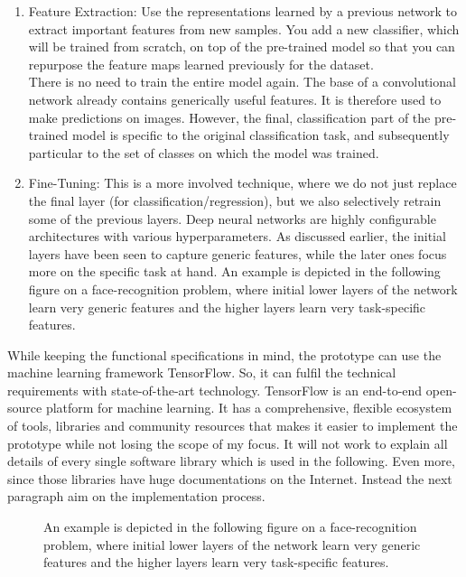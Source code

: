 \begin{enumerate}
	\item Feature Extraction: Use the representations learned by a previous network to extract important features from new samples. You add a new classifier, which will be trained from scratch, on top of the pre-trained model so that you can repurpose the feature maps learned previously for the dataset.\\
	
	There is no need to train the entire model again. The base of a convolutional network already contains generically useful features.  It is therefore used to make predictions on images. However, the final, classification part of the pre-trained model is specific to the original classification task, and subsequently particular to the set of classes on which the model was trained.
	
	\item 
	Fine-Tuning: This is a more involved technique, where we do not just replace the final layer (for classification/regression), but we also selectively retrain some of the previous layers. Deep neural networks are highly configurable architectures with various hyperparameters. As discussed earlier, the initial layers have been seen to capture generic features, while the later ones focus more on the specific task at hand. An example is depicted in the following figure on a face-recognition problem, where initial lower layers of the network learn very generic features and the higher layers learn very task-specific features.
\end{enumerate}

While keeping the functional specifications in mind, the prototype can use the machine learning framework TensorFlow. So, it can fulfil the technical requirements with state-of-the-art technology. TensorFlow is an end-to-end open-source platform for machine learning. It has a comprehensive, flexible ecosystem of tools, libraries and community resources that makes it easier to implement the prototype while not losing the scope of my focus. It will not work to explain all details of every single software library which is used in the following. Even more, since those libraries have huge documentations on the Internet. Instead the next paragraph aim on the implementation process.

\begin{figure}[htp]
	\centering
	\caption{An example is depicted in the following figure on a face-recognition problem, where initial lower layers of the network learn very generic features and the higher layers learn very task-specific features.
	}
	\label{fig:hierachical_feature_representations}
\end{figure}

